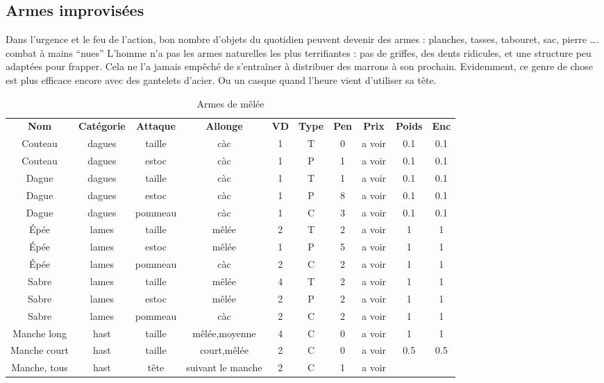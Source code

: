\documentclass[10pt,a4paper,twocolumn]{book}
\begin{document}
\subsection*{Armes improvisées}
Dans l’urgence et le feu de l’action, bon nombre d’objets du quotidien peuvent devenir des armes : planches, tasses, tabouret, sac, pierre ….
combat à mains “nues”
L’homme n’a pas les armes naturelles les plus terrifiantes : pas de griffes, des dents ridicules, et une structure peu adaptées pour frapper. Cela ne l’a jamais empêché de s'entraîner à distribuer des marrons à son prochain. Evidemment, ce genre de chose est plus efficace encore avec des gantelets d’acier. Ou un casque quand l’heure vient d’utiliser sa tête.
\begin{table*}
\caption{Armes de mêlée}
\label{armesmelee}

\begin{tabular}{cccccccccc}
\textbf{Nom}&\textbf{Catégorie}&\textbf{Attaque}&\textbf{Allonge}&\textbf{VD}&\textbf{Type}&\textbf{Pen}&\textbf{Prix}&\textbf{Poids}&\textbf{Enc}\\
Couteau & dagues & taille & càc & 1 & T & 0 & a voir & 0.1 & 0.1\\
Couteau & dagues & estoc & càc & 1 & P & 1 & a voir &0.1&0.1\\
Dague & dagues & taille & càc & 1 & T & 1 & a voir & 0.1 & 0.1 \\
Dague & dagues & estoc & càc & 1 & P & 8 & a voir & 0.1 & 0.1 \\
Dague & dagues & pommeau & càc & 1 & C & 3 & a voir & 0.1 & 0.1 \\
\'Epée & lames & taille & mêlée & 2 & T & 2 & a voir & 1 & 1 \\
\'Epée & lames & estoc & mêlée & 1 & P & 5 & a voir & 1 & 1 \\
\'Epée & lames & pommeau & càc & 2 & C & 2 & a voir & 1 & 1 \\
Sabre & lames & taille & mêlée & 4 & T & 2 & a voir & 1 & 1 \\
Sabre & lames & estoc & mêlée & 2 & P & 2 & a voir & 1 & 1 \\
Sabre & lames & pommeau & càc & 2 & C & 2 & a voir & 1 & 1 \\
Manche long & hast & taille & mêlée,moyenne & 4 & C & 0 & a voir & 1 & 1 \\
Manche court & hast & taille & court,mêlée & 2 & C & 0 & a voir & 0.5 & 0.5 \\
Manche, tous & hast & tête & suivant le manche & 2 & C & 1 & a voir &  & \\

\end{tabular}
\end{table*}
\end{document}
